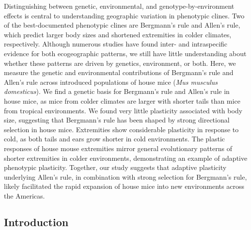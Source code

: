 \documentclass[]{article}
\begin{document}
Distinguishing between genetic, environmental, and
genotype-by-environment effects is central to understanding geographic
variation in phenotypic clines. Two of the best-documented phenotypic
clines are Bergmann's rule and Allen's rule, which predict larger body
sizes and shortened extremities in colder climates, respectively.
Although numerous studies have found inter- and intraspecific evidence
for both ecogeographic patterns, we still have little understanding
about whether these patterns are driven by genetics, environment, or
both. Here, we measure the genetic and environmental contributions of
Bergmann's rule and Allen's rule across introduced populations of house
mice (\emph{Mus musculus domesticus}). We find a genetic basis for
Bergmann's rule and Allen's rule in house mice, as mice from colder
climates are larger with shorter tails than mice from tropical
environments. We found very little plasticity associated with body size,
suggesting that Bergmann's rule has been shaped by strong directional
selection in house mice. Extremities show considerable plasticity in
response to cold, as both tails and ears grow shorter in cold
environments. The plastic responses of house mouse extremities mirror
general evolutionary patterns of shorter extremities in colder
environments, demonstrating an example of adaptive phenotypic
plasticity. Together, our study suggests that adaptive plasticity
underlying Allen's rule, in combination with strong selection for
Bergmann's rule, likely facilitated the rapid expansion of house mice
into new environments across the Americas.

\newpage

\hypertarget{introduction}{%
\subsection{Introduction}\label{introduction}}
\end{document}

